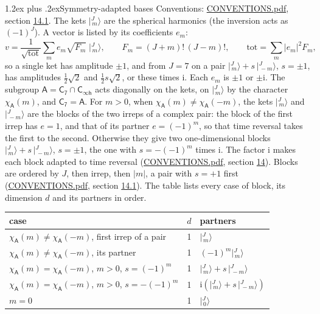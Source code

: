 \documentclass[10pt,a4paper]{article}
\makeatletter
\renewcommand\section{\@startsection{section}{1}{\z@}{-3ex plus -1ex minus -.2ex}%
  {1.2ex plus .2ex}{\normalfont\large\sffamily\bfseries\color{parttitle}}}
\numberwithin{equation}{section}
\newcommand{\grp}[1]{\mathsf{#1}}
\newcommand{\iunit}{\mathrm{i}}
\newcommand{\chiA}{\chi_{\grp{A}}}
\newcommand{\jm}[2]{\bigl\lvert{}^{#1}_{\,#2}\bigr\rangle}
\makeatother
\begin{document}
\section{Symmetry-adapted bases}\label{s:bases}
Conventions: \href{../../CONVENTIONS.pdf}{CONVENTIONS.pdf}, section \href{../../CONVENTIONS.pdf\#conv.14.1}{14.1}.
\leavevmode\label{n:index.m}\label{n:vector.ket}The kets $\jm{J}{m}$ are the spherical harmonics (the inversion acts as $(-1)^J$). \label{n:index.ketcoefficient}\label{n:vector.basis.symmetry}\label{n:index.ketweight}\label{n:index.total}A vector is listed by its coefficients $e_m$:
\begin{equation}\label{e:ket}v = \frac{1}{\sqrt{\mathrm{tot}}}\sum_m e_m\sqrt{F_m}\;\jm{J}{m},\qquad F_m = (J+m)!\,(J-m)!,\qquad \mathrm{tot} = \sum_m |e_m|^2F_m,\end{equation}
\leavevmode\label{n:index.pair.sign}so a single ket has amplitude $\pm1$, and from $J = 7$ on a pair $\jm{J}{m} + s\,\jm{J}{-m}$, $s = \pm1$, has amplitudes $\tfrac{1}{2}\sqrt{2}$ and $\tfrac{1}{2}s\sqrt{2}$, or these times $\iunit$. Each $e_m$ is $\pm1$ or $\pm\iunit$.
\leavevmode\label{n:group.A}\label{n:function.character.abelian}The subgroup $\grp{A} = \grp{C_{7}}\cap\grp{C_{\infty h}}$ acts diagonally on the kets, on $\jm{J}{m}$ by the character $\chiA(m)$, and $\grp{C_{7}} = \grp{A}$. For $m > 0$, when $\chiA(m) \ne \chiA(-m)$, the kets $\jm{J}{m}$ and $\jm{J}{-m}$ are the blocks of the two irreps of a complex pair: the block of the first irrep has $e = 1$, and that of its partner $e = (-1)^m$, so that time reversal takes the first to the second. Otherwise they give two one-dimensional blocks $\jm{J}{m} + s\,\jm{J}{-m}$, $s = \pm1$, the one with $s = -(-1)^m$ times $\iunit$. The factor $\iunit$ makes each block adapted to time reversal (\href{../../CONVENTIONS.pdf}{CONVENTIONS.pdf}, section \href{../../CONVENTIONS.pdf\#conv.14}{14}). Blocks are ordered by $J$, then irrep, then $|m|$, a pair with $s = +1$ first (\href{../../CONVENTIONS.pdf}{CONVENTIONS.pdf}, section \href{../../CONVENTIONS.pdf\#conv.14.1}{14.1}).
\leavevmode\label{n:head.case}\label{n:head.partners}The table lists every case of block, its dimension $d$ and its partners in order.
\begin{center}\begin{tabular}{@{}lrl@{}}\toprule
case & $d$ & partners\\\midrule
$\chiA(m) \ne \chiA(-m)$, first irrep of a pair & 1 & $\jm{J}{m}$\\
$\chiA(m) \ne \chiA(-m)$, its partner & 1 & $(-1)^m\jm{J}{m}$\\
$\chiA(m) = \chiA(-m)$, $m > 0$, $s = (-1)^m$ & 1 & $\jm{J}{m} + s\,\jm{J}{-m}$\\
$\chiA(m) = \chiA(-m)$, $m > 0$, $s = -(-1)^m$ & 1 & $\iunit(\jm{J}{m} + s\,\jm{J}{-m})$\\
$m = 0$ & 1 & $\jm{J}{0}$\\
\bottomrule\end{tabular}\end{center}
\end{document}
